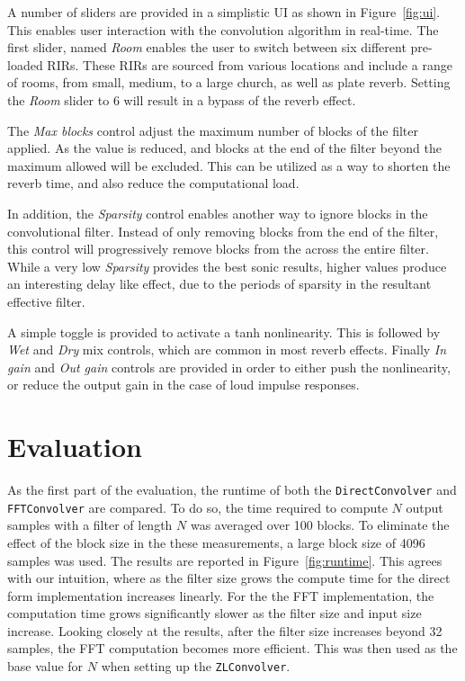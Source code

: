 \documentclass{article}
\begin{document}
A number of sliders are provided in a simplistic UI as shown in Figure~\ref{fig:ui}.
This enables user interaction with the convolution algorithm in real-time. 
The first slider, named \emph{Room} enables the user to switch between six different pre-loaded RIRs. 
These RIRs are sourced from various locations and include a range of rooms, from small, medium, to a large church, as well as plate reverb. 
Setting the \emph{Room} slider to 6 will result in a bypass of the reverb effect. 

The \emph{Max blocks} control adjust the maximum number of blocks of the filter applied. 
As the value is reduced, and blocks at the end of the filter beyond the maximum allowed will be excluded.
This can be utilized as a way to shorten the reverb time, and also reduce the computational load. 

In addition, the \emph{Sparsity} control enables another way to ignore blocks in the convolutional filter. 
Instead of only removing blocks from the end of the filter, this control will progressively remove 
blocks from the across the entire filter. 
While a very low \emph{Sparsity} provides the best sonic results, higher values produce an interesting delay like effect, 
due to the periods of sparsity in the resultant effective filter. 

A simple toggle is provided to activate a tanh nonlinearity.
This is followed by \emph{Wet} and \emph{Dry} mix controls, which are common in most reverb effects. 
Finally \emph{In gain} and \emph{Out gain} controls are provided in order to either push the nonlinearity, 
or reduce the output gain in the case of loud impulse responses. 

\section{Evaluation}\label{sec:eval}

As the first part of the evaluation, the runtime of both the \texttt{DirectConvolver} and \texttt{FFTConvolver} are compared.
To do so, the time required to compute $N$ output samples with a filter of length $N$ was averaged over 100 blocks. 
To eliminate the effect of the block size in the these measurements, a large block size of 4096 samples was used. 
The results are reported in Figure~\ref{fig:runtime}.
This agrees with our intuition, where as the filter size grows the compute time for the direct form implementation increases linearly. 
For the the FFT implementation, the computation time grows significantly slower as the filter size and input size increase.
Looking closely at the results, after the filter size increases beyond 32 samples, the FFT computation becomes more efficient. 
This was then used as the base value for $N$ when setting up the \texttt{ZLConvolver}. 
\end{document}
